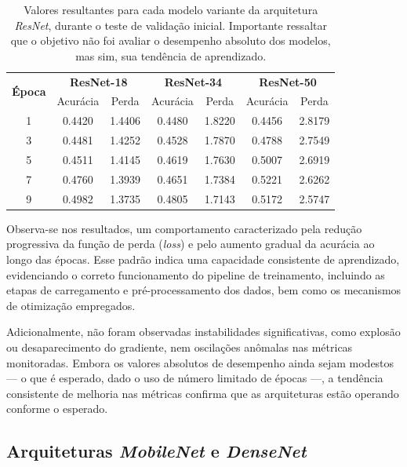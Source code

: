 \begin{table}[h]
	\centering
	\caption{Valores resultantes para cada modelo variante da arquitetura \textit{ResNet}, durante o teste de validação inicial. Importante ressaltar que o objetivo não foi avaliar o desempenho absoluto dos modelos, mas sim, sua tendência de aprendizado.}
	\begin{tabular}{c|cc|cc|cc}
		
		\toprule
		\multirow{2}{*}{\textbf{Época}} 
		& \multicolumn{2}{c|}{\textbf{ResNet-18}} 
		& \multicolumn{2}{c|}{\textbf{ResNet-34}} 
		& \multicolumn{2}{c}{\textbf{ResNet-50}} \\
		
		& Acurácia & Perda & Acurácia & Perda & Acurácia & Perda \\
		
		\midrule
		
		1  & 0.4420 & 1.4406 & 0.4480 & 1.8220 & 0.4456 & 2.8179 \\
		3  & 0.4481 & 1.4252 & 0.4528 & 1.7870 & 0.4788 & 2.7549 \\
		5  & 0.4511 & 1.4145 & 0.4619 & 1.7630 & 0.5007 & 2.6919 \\
		7  & 0.4760 & 1.3939 & 0.4651 & 1.7384 & 0.5221 & 2.6262 \\
		9  & 0.4982 & 1.3735 & 0.4805 & 1.7143 & 0.5172 & 2.5747 \\
		\bottomrule
	\end{tabular}
	\label{tab:resnet_sanity_unified}
\end{table}

Observa-se nos resultados, um comportamento caracterizado pela redução progressiva da função de perda (\textit{loss}) e pelo aumento gradual da acurácia ao longo das épocas. Esse padrão indica uma capacidade consistente de aprendizado, evidenciando o correto funcionamento do pipeline de treinamento, incluindo as etapas de carregamento e pré-processamento dos dados, bem como os mecanismos de otimização empregados. 

Adicionalmente, não foram observadas instabilidades significativas, como explosão ou desaparecimento do gradiente, nem oscilações anômalas nas métricas monitoradas. Embora os valores absolutos de desempenho ainda sejam modestos — o que é esperado, dado o uso de número limitado de épocas —, a tendência consistente de melhoria nas métricas confirma que as arquiteturas estão operando conforme o esperado.

\subsection{Arquiteturas \textit{MobileNet} e \textit{DenseNet}}

